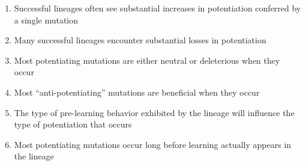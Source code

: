 \begin{enumerate}
    \item Successful lineages often see substantial increases in potentiation conferred by a single mutation
    \item Many successful lineages encounter substantial losses in potentiation
    \item Most potentiating mutations are either neutral or deleterious when they occur
    \item Most ``anti-potentiating'' mutations are beneficial when they occur
    \item The type of pre-learning behavior exhibited by the lineage will influence the type of potentiation that occurs
    \item Most potentiating mutations occur long before learning actually appears in the lineage
\end{enumerate}








